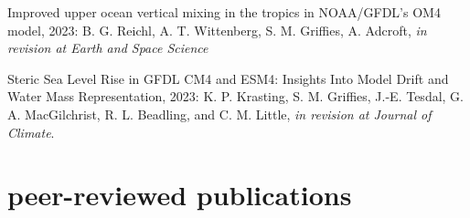 \begin{etaremune}
\item Improved upper ocean vertical mixing in the tropics in NOAA/GFDL's OM4 model, 2023: B. G. Reichl, A. T. Wittenberg, S. M. Grif\/f\/ies, A. Adcroft, {\it in revision at Earth and Space Science} 

\item Steric Sea Level Rise in GFDL CM4 and ESM4: Insights Into Model Drift and Water Mass Representation, 2023: K. P. Krasting, S. M. Grif\/f\/ies, J.-E. Tesdal, G. A. MacGilchrist, R. L. Beadling, and C. M. Little, {\it in revision at Journal of Climate}.


\end{etaremune}


\section*{\sc \color{Maroon} peer-reviewed publications}

\small 

